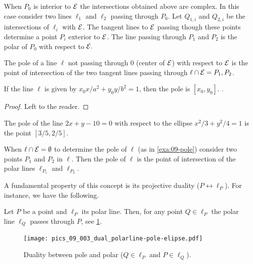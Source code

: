   \begin{remark} When $P_0$ is interior to $\mathcal{E}$ the intersections obtained above are complex.
  In this case consider two lines $\ell_1$ and $\ell_2$ passing through $P_0$. Let $Q_{1,i} $ and $Q_{2,i} $ be the intersections of $\ell_i$ with $\mathcal{E}$. The   tangent lines to $\mathcal{E}$ passing though these points determine a point $P_i$ exterior to $\mathcal{E}$. The line passing through $P_1$ and $P_2$ is the polar of $P_0$ with respect to $\mathcal{E}.$  
  \end{remark}
\begin{definition}
The pole of a line $\ell$ not passing through $0$ (center of $\mathcal{E}$) with respect to $\mathcal{E}$ is the point of  intersection of the two tangent lines passing through  $\ell\cap\mathcal{E}={P_1,P_2}$.
\label{def:09-pole}
\end{definition}

\begin{lemma} If the line $\ell$ is given by $x_0 x /a^2+y_0y/b^2=1$, then the pole is $[x_0,y_0].$
\label{lem:09-polar}.
\end{lemma}
\begin{proof}
Left to the reader.
\end{proof}

\begin{example} The pole of the line $2x+y-10=0$ with respect to the ellipse $x^2/3+y^2/4=1$ is the point
$[3/5,2/5]$.
\label{exa:09-pole}
\end{example}

\begin{remark}
When $\ell\cap\mathcal{E}=\emptyset $ to determine the pole of $\ell$ (as in   \cref{exa:09-pole}) consider two points $P_1$ and $P_2$ in $\ell$. Then the pole of $\ell$ is the point
of intersection of the polar lines $\ell_{P_1}$ and $\ell_{P_2}$.
\end{remark}

A fundamental property of this concept is its projective duality ($P \leftrightarrow \ell_P$). For instance, we have the following.
\begin{proposition} 
    Let $P$ be a point and $\ell_P$ its polar line. Then, for any point $Q\in \ell_P$ the polar line $\ell_Q$ passes through $P$,   see \cref{fig:pics-09-polarpole-ellipse}.
    \label{prop:09-pole-polar}
\end{proposition}

\begin{figure}
    \centering
    \texttt{[image: pics\_09\_003\_dual\_polarline-pole-elipse.pdf]}
    \caption{Duality between pole and polar ($Q \in \ell_P$ and $P\in \ell_Q$).}
    \label{fig:pics-09-polarpole-ellipse}
\end{figure}

